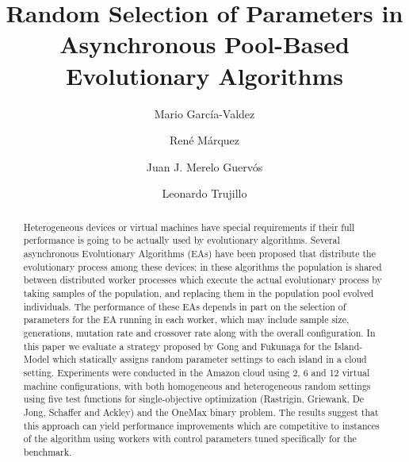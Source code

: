 \documentclass{llncs}
\begin{document}
\sloppy

\title{Random Selection of Parameters in Asynchronous Pool-Based Evolutionary Algorithms}

\author{Mario Garc\'ia-Valdez \and Ren\'e M\'arquez \and Juan J. Merelo Guerv\'os \and  Leonardo Trujillo }


\maketitle

\begin{abstract}
Heterogeneous devices or virtual machines have special requirements if
their full performance is going to be actually used by evolutionary
algorithms. Several asynchronous Evolutionary Algorithms (EAs) have
been proposed that distribute the evolutionary process among these
devices; in these algorithms the population is shared between
distributed worker processes which execute the actual evolutionary
process by taking samples of the population, and replacing them in the
population pool evolved individuals. The performance of these EAs
depends in part on the selection of parameters for the EA running in
each worker, which may include sample size, generations, mutation rate
and crossover rate along with the overall configuration. In this paper
we evaluate a strategy proposed by Gong and Fukunaga for the
Island-Model which statically assigns random parameter settings to
each island in a cloud setting. Experiments were conducted in the
Amazon cloud using 2, 6 and 12 virtual machine configurations, with
both homogeneous and heterogeneous random settings using five 
test functions for single-objective optimization (Rastrigin, Griewank, De Jong, Schaffer 
and Ackley) and the OneMax binary problem. The results suggest that this approach can yield
performance improvements which are competitive to instances of the
algorithm using workers with control parameters tuned specifically for
the benchmark.

\end{abstract}
\end{document}
